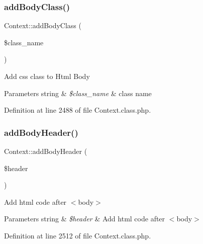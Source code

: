 \hypertarget{classContext_ad266c6556167746e9368c4b1a7f6b16b}{}\label{classContext_ad266c6556167746e9368c4b1a7f6b16b} 
\subsubsection{\texorpdfstring{add\+Body\+Class()}{addBodyClass()}}
{\footnotesize\ttfamily Context\+::add\+Body\+Class (\begin{DoxyParamCaption}\item[{}]{\$class\+\_\+name }\end{DoxyParamCaption})}

Add css class to Html Body


\begin{DoxyParams}[1]{Parameters}
string & {\em \$class\+\_\+name} & class name \\
\hline
\end{DoxyParams}


Definition at line 2488 of file Context.\+class.\+php.

\hypertarget{classContext_ae7c9dad9ccd3e410283e21c67f395114}{}\label{classContext_ae7c9dad9ccd3e410283e21c67f395114} 
\subsubsection{\texorpdfstring{add\+Body\+Header()}{addBodyHeader()}}
{\footnotesize\ttfamily Context\+::add\+Body\+Header (\begin{DoxyParamCaption}\item[{}]{\$header }\end{DoxyParamCaption})}

Add html code after $<$body$>$


\begin{DoxyParams}[1]{Parameters}
string & {\em \$header} & Add html code after $<$body$>$ \\
\hline
\end{DoxyParams}


Definition at line 2512 of file Context.\+class.\+php.

\hypertarget{classContext_ac08df39b79aca5d52cc5d45adba5d3a6}{}\label{classContext_ac08df39b79aca5d52cc5d45adba5d3a6} 

